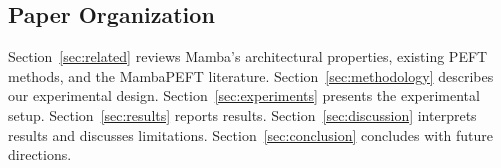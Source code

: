\subsection{Paper Organization}

Section~\ref{sec:related} reviews Mamba's architectural properties, existing PEFT methods, and the MambaPEFT literature. Section~\ref{sec:methodology} describes our experimental design. Section~\ref{sec:experiments} presents the experimental setup. Section~\ref{sec:results} reports results. Section~\ref{sec:discussion} interprets results and discusses limitations. Section~\ref{sec:conclusion} concludes with future directions.
